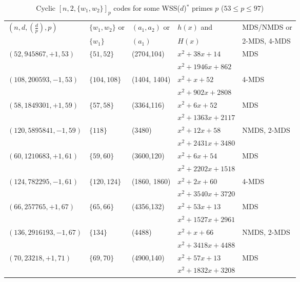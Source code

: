 \documentclass[12pt,reqno]{amsart}
\begin{document}
    \begin{table}[htbp]
    \center
	\caption{Cyclic $[n, 2, \{w_1, w_2\}]_p$ codes for some WSS($d$)$^*$ primes $p$ ($53 \le p \le 97$)} \label{tab-two-weight-3}
\scriptsize{
	\begin{tabular}{lllll}
		\toprule
		$(n, d, (\frac{d}{p}), p)$ & $\{w_1,w_2\}$  or  & $(a_1,a_2)$ or  & $h(x)$ and & MDS/NMDS or \\
		                        &  $\{w_1\}$ & $(a_1)$ & $H(x)$ & 2-MDS, 4-MDS\\
		\toprule

		$(52,945867,+1,53)$ & $\{51,52\}$ & (2704,104) &  $x^2 +38x +14$ & MDS\\
& & &  $x^2 + 1946x + 862$  &\\

		$(108,200593,-1,53)$ & $\{104,108\}$ & (1404, 1404) &  $x^2 + x +52$ & 4-MDS\\
& & & $x^2 + 902x + 2808$ & \\

\hline
		$(58,1849301,+1,59)$ & $\{57,58\}$ & (3364,116) &  $x^2 +6x +52$ & MDS\\
& & &  $x^2 + 1363x + 2117$ & \\
		$(120, 5895841,-1,59)$ & $\{118\}$ & (3480) &  $x^2 + 12x +58$ & NMDS, 2-MDS \\
& & & $x^2 + 2431x + 3480$ & \\

\hline
		$(60,1210683,+1,61)$ & $\{59,60\}$ & (3600,120) &  $x^2 +6x +54$ & MDS\\
& & & $x^2 + 2202x + 1518$ & \\

		$(124,782295,-1,61)$ & $\{120, 124\}$ & (1860, 1860) &  $x^2 + 2x +60$ & 4-MDS \\
& & & $x^2 + 3540x + 3720$ & \\

\hline
		$(66,257765,+1,67)$ & $\{65,66\}$ & (4356,132) &  $x^2 +53x +13$ & MDS\\
& & & $x^2 + 1527x + 2961$ & \\

		$(136,2916193,-1,67)$ & $\{134\}$ & (4488) &  $x^2 + x +66$ & NMDS, 2-MDS \\
& & & $x^2 + 3418x + 4488$ & \\

\hline

		$(70,23218,+1,71)$ & $\{69,70\}$ & (4900,140) &  $x^2 +57x +13$ & MDS\\
& & & $x^2 + 1832x + 3208$ & \\


\end{tabular}}
\end{table}
\end{document}
